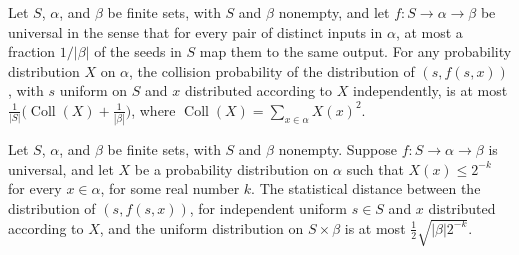 \begin{theorem}
\label{TCSlib.InformationTheory.collision_hashPair_le}
\leanok
{}
Let $S$, $\alpha$, and $\beta$ be finite sets, with $S$ and $\beta$ nonempty, and let
$f\colon S\to\alpha\to\beta$ be universal in the sense that for every pair of distinct
inputs in $\alpha$, at most a fraction $1/|\beta|$ of the seeds in $S$ map them to the
same output. For any probability distribution $X$ on $\alpha$, the collision probability
of the distribution of $(s,f(s,x))$, with $s$ uniform on $S$ and $x$ distributed
according to $X$ independently, is at most
$\frac{1}{|S|}\bigl(\operatorname{Coll}(X)+\frac{1}{|\beta|}\bigr)$, where
$\operatorname{Coll}(X)=\sum_{x\in\alpha}X(x)^2$.
\end{theorem}

\begin{theorem}
\label{TCSlib.InformationTheory.leftover_hash}
\leanok
{}
Let $S$, $\alpha$, and $\beta$ be finite sets, with $S$ and $\beta$ nonempty. Suppose
$f\colon S\to\alpha\to\beta$ is universal, and let $X$ be a probability distribution on
$\alpha$ such that $X(x)\le 2^{-k}$ for every $x\in\alpha$, for some real number $k$.
The statistical distance between the distribution of $(s,f(s,x))$, for independent
uniform $s\in S$ and $x$ distributed according to $X$, and the uniform distribution on
$S\times\beta$ is at most $\frac12\sqrt{|\beta|2^{-k}}$.
\end{theorem}


